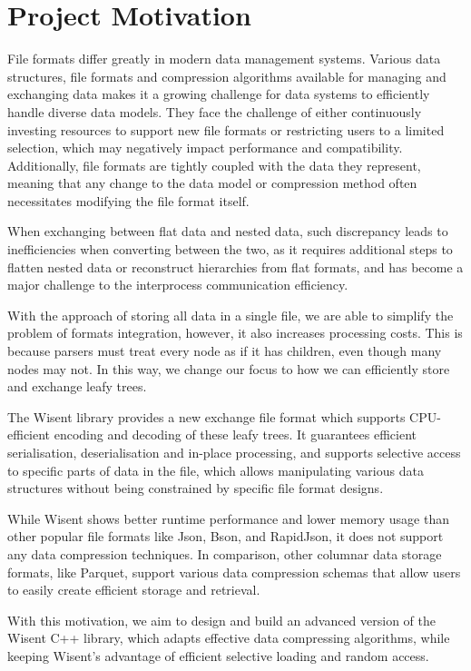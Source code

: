 \section{Project Motivation}

File formats differ greatly in modern data management systems. Various data structures, file formats and compression algorithms available for managing and exchanging data makes it a growing challenge for data systems to efficiently handle diverse data models. They face the challenge of either continuously investing resources to support new file formats or restricting users to a limited selection, which may negatively impact performance and compatibility. Additionally, file formats are tightly coupled with the data they represent, meaning that any change to the data model or compression method often necessitates modifying the file format itself.

When exchanging between flat data and nested data, such discrepancy leads to inefficiencies when converting between the two, as it requires additional steps to flatten nested data or reconstruct hierarchies from flat formats, and has become a major challenge to the interprocess communication efficiency. 

With the approach of storing all data in a single file, we are able to simplify the problem of formats integration, however, it also increases processing costs. This is because parsers must treat every node as if it has children, even though many nodes may not. In this way, we change our focus to how we can efficiently store and exchange leafy trees.

The Wisent library \cite{mohr2023wisent} provides a new exchange file format which supports CPU-efficient encoding and decoding of these leafy trees. It guarantees efficient serialisation, deserialisation and in-place processing, and supports selective access to specific parts of data in the file, which allows manipulating various data structures without being constrained by specific file format designs. 

While Wisent shows better runtime performance and lower memory usage than other popular file formats like Json\cite{json_org}, Bson\cite{bson_specification}, and RapidJson\cite{rapidjson}, it does not support any data compression techniques. In comparison, other columnar data storage formats, like Parquet\cite{apache_parquet}, support various data compression schemas that allow users to easily create efficient storage and retrieval. 

With this motivation, we aim to design and build an advanced version of the Wisent C++ library, which adapts effective data compressing algorithms, while keeping Wisent's advantage of efficient selective loading and random access. 

